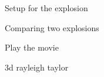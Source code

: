 \begin{frame}{Setup for the explosion}
\begin{minipage}{0.3\textwidth}
\begin{block}{}
\begin{figure}
        	  					\end{figure}
        	  		  	\end{block}
        	  	\end{minipage}
\end{frame}

\begin{frame}{Comparing two explosions}

Play the movie

\end{frame}

\begin{frame}{3d rayleigh taylor}



\end{frame}








	